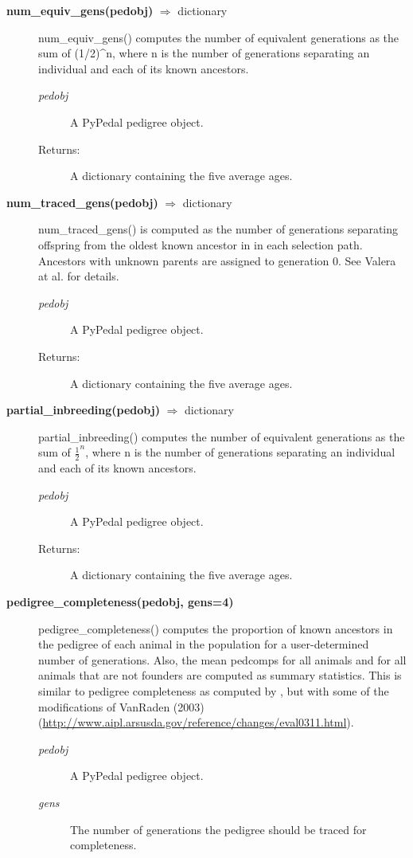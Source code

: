 \begin{description}
\item[\textbf{num\_equiv\_gens(pedobj)} $\Rightarrow$ dictionary]
num\_equiv\_gens() computes the number of equivalent generations as the sum of (1/2)\^{}n, where n is the number of generations separating an individual and each of its known ancestors.
\begin{description}
\item[\emph{pedobj}] A PyPedal pedigree object.
\item[Returns:] A dictionary containing the five average ages.
\end{description}

\item[\textbf{num\_traced\_gens(pedobj)} $\Rightarrow$ dictionary]
num\_traced\_gens() is computed as the number of generations separating offspring from the oldest known ancestor in in each selection path. Ancestors with unknown parents are assigned to generation 0. See Valera at al. \cite{Valera2005a} for details.
\begin{description}
\item[\emph{pedobj}] A PyPedal pedigree object.
\item[Returns:] A dictionary containing the five average ages.
\end{description}

\item[\textbf{partial\_inbreeding(pedobj)} $\Rightarrow$ dictionary]
partial\_inbreeding() computes the number of equivalent generations as the sum of $\frac{1}{2}^{n}$, where n is the number of generations separating an individual and each of its known ancestors.
\begin{description}
\item[\emph{pedobj}] A PyPedal pedigree object.
\item[Returns:] A dictionary containing the five average ages.
\end{description}

\item[\textbf{pedigree\_completeness(pedobj, gens=4)}]
pedigree\_completeness() computes the proportion of known ancestors in the pedigree of each animal in the population for a user-determined number of generations. Also, the mean pedcomps for all animals and for all animals that are not founders are computed as summary statistics.  This is similar to pedigree completeness as computed by , but with some of the modifications of VanRaden (2003) (\url{http://www.aipl.arsusda.gov/reference/changes/eval0311.html}).
\begin{description}
\item[\emph{pedobj}] A PyPedal pedigree object.
\item[\emph{gens}] The number of generations the pedigree should be traced for completeness.
\end{description}


\end{description}

